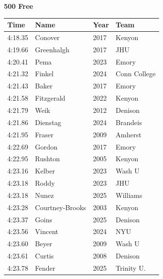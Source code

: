 \noindent\begin{minipage}[t]{0.98\textwidth}
\centering
\textbf{\textcolor{teamprimary}{500 Free}}\par
\vspace{0.5em}
\centering
\small
\renewcommand{\arraystretch}{1.0}
\setlength{\tabcolsep}{4pt}
\begin{tabular}{@{}p{2.5cm}p{4.5cm}p{1.5cm}p{2.5cm}@{}}
\toprule
\textbf{Time} & \textbf{Name} & \textbf{Year} & \textbf{Team} \\
\midrule
4:18.35 & Conover & 2017 & Kenyon \\
4:19.66 & Greenhalgh & 2017 & JHU \\
4:20.41 & Pema & 2023 & Emory \\
4:21.32 & Finkel & 2024 & Conn College \\
4:21.43 & Baker & 2017 & Emory \\
4:21.58 & Fitzgerald & 2022 & Kenyon \\
4:21.79 & Weik & 2012 & Denison \\
4:21.86 & Dienstag & 2024 & Brandeis \\
4:21.95 & Fraser & 2009 & Amherst \\
4:22.69 & Gordon & 2017 & Emory \\
4:22.95 & Rushton & 2005 & Kenyon \\
4:23.16 & Kelber & 2023 & Wash U \\
4:23.18 & Roddy & 2023 & JHU \\
4:23.18 & Nunez & 2025 & Williams \\
4:23.28 & Courtney-Brooks & 2003 & Kenyon \\
4:23.37 & Goins & 2025 & Denison \\
4:23.56 & Vincent & 2024 & NYU \\
4:23.60 & Beyer & 2009 & Wash U \\
4:23.61 & Curtis & 2008 & Denison \\
4:23.78 & Fender & 2025 & Trinity U. \\
\bottomrule
\end{tabular}
\end{minipage}
\vspace{1.2em}
